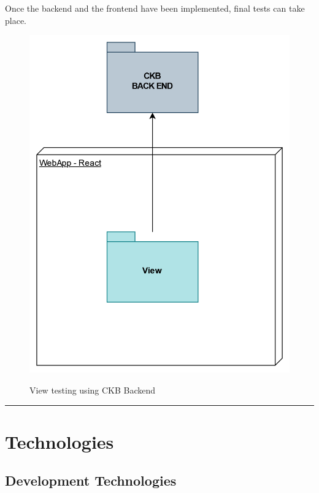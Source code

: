 \documentclass{Configuration_Files/Template}
\begin{document}
Once the backend and the frontend have been implemented, final tests can take place.

\begin{figure}[H]
\centering
\includegraphics[scale = 0.55]{Images/diagrams/ImplementationPlan_Full.png}\\
\caption{View testing using CKB Backend}
\end{figure}

{\color{bluepoli}\rule{\linewidth}{0.1pt}}

\section{Technologies}

\subsection{Development Technologies}
\end{document}
